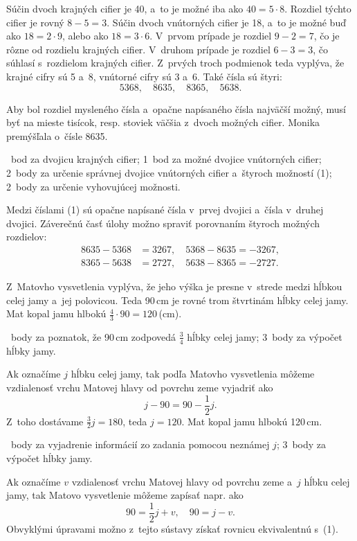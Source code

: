 {%
Súčin dvoch krajných cifier je 40, a~to je možné iba ako $40=5\cdot 8$.
Rozdiel týchto cifier je rovný $8-5=3$.
Súčin dvoch vnútorných cifier je 18, a~to je možné buď ako $18=2\cdot 9$, alebo ako $18=3\cdot 6$.
V~prvom prípade je rozdiel $9-2=7$, čo je rôzne od rozdielu krajných cifier.
V~druhom prípade je rozdiel $6-3=3$, čo súhlasí s~rozdielom krajných cifier.
Z~prvých troch podmienok teda vyplýva, že krajné cifry sú 5 a~8, vnútorné cifry sú 3 a~6.
Také čísla sú štyri:
$$
5368,\quad 8635,\quad 8365,\quad 5638. \tag{1}
$$

Aby bol rozdiel mysleného čísla a~opačne napísaného čísla najväčší možný, musí byť na mieste tisícok, resp.
stoviek väčšia z~dvoch možných cifier.
Monika premýšľala o~čísle 8635.

~bod za dvojicu krajných cifier;
1~bod za možné dvojice vnútorných cifier;
2~body za určenie správnej dvojice vnútorných cifier a~štyroch možností (1);
2~body za určenie vyhovujúcej možnosti.
\endhodnotenie

\poznamka
Medzi číslami (1) sú opačne napísané čísla v~prvej dvojici a~čísla v~druhej dvojici.
Záverečnú časť úlohy možno spraviť porovnaním štyroch možných rozdielov:
$$
\begin{aligned}
8635-5368&=3267,\quad 5368-8635=-3267,\\
8365-5638&=2727,\quad 5638-8365=-2727.
\end{aligned}
$$
}

{%
Z~Matovho vysvetlenia vyplýva, že jeho výška je presne v~strede medzi hĺbkou celej jamy a~jej polovicou.
Teda 90\,cm je rovné trom štvrtinám hĺbky celej jamy.
Mat kopal jamu hlbokú $\frac43\cdot 90=120$\,(cm).

~body za poznatok, že 90\,cm zodpovedá $\frac34$ hĺbky celej jamy;
3~body za výpočet hĺbky jamy.
\endhodnotenie

\ineriesenie
Ak označíme $j$ hĺbku celej jamy, tak podľa Matovho vysvetlenia môžeme vzdialenosť vrchu Matovej hlavy od povrchu zeme vyjadriť ako
$$
j-90=90-\frac12j. \tag{1}
$$
Z~toho dostávame $\frac32j=180$, teda $j=120$.
Mat kopal jamu hlbokú 120\,cm.

~body za vyjadrenie informácií zo zadania pomocou neznámej $j$;
3~body za výpočet hĺbky jamy.
\endhodnotenie

\poznamka
Ak označíme $v$ vzdialenosť vrchu Matovej hlavy od povrchu zeme a~$j$ hĺbku celej jamy, tak Matovo vysvetlenie môžeme zapísať napr. ako
$$
90=\frac12j+v,\quad 90=j-v.
$$
Obvyklými úpravami možno z~tejto sústavy získať rovnicu ekvivalentnú s~(1).
}

